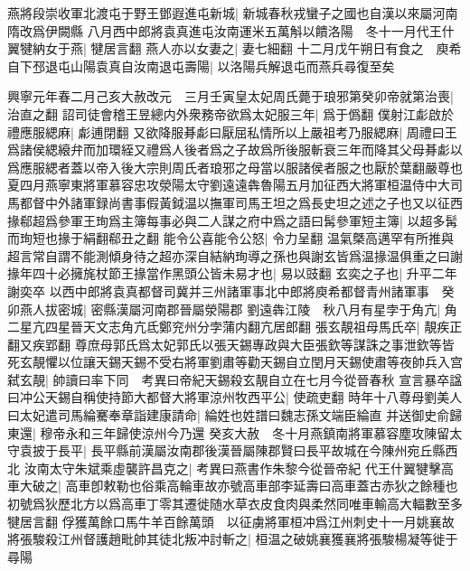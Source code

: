 燕將段崇收軍北渡屯于野王鄧遐進屯新城|{
	新城春秋戎蠻子之國也自漢以來屬河南隋改爲伊闕縣}
八月西中郎將袁真進屯汝南運米五萬斛以饋洛陽　冬十一月代王什翼犍納女于燕|{
	犍居言翻}
燕人亦以女妻之|{
	妻七細翻}
十二月戊午朔日有食之　庾希自下邳退屯山陽袁真自汝南退屯壽陽|{
	以洛陽兵解退屯而燕兵尋復至矣}


興寧元年春二月己亥大赦改元　三月壬寅皇太妃周氏薨于琅邪第癸卯帝就第治喪|{
	治直之翻}
詔司徒會稽王昱總内外衆務帝欲爲太妃服三年|{
	爲于僞翻}
僕射江虨啟於禮應服緦麻|{
	虨逋閉翻}
又欲降服朞虨曰厭屈私情所以上嚴祖考乃服緦麻|{
	周禮曰王爲諸侯緦縗弁而加環絰又禮爲人後者爲之子故爲所後服斬衰三年而降其父母朞虨以爲應服緦者蓋以帝入後大宗則周氏者琅邪之母當以服諸侯者服之也厭於葉翻嚴尊也}
夏四月燕寧東將軍慕容忠攻滎陽太守劉遠遠犇魯陽五月加征西大將軍桓温侍中大司馬都督中外諸軍録尚書事假黃鉞温以撫軍司馬王坦之爲長史坦之述之子也又以征西掾郗超爲參軍王珣爲主簿每事必與二人謀之府中爲之語曰髯參軍短主簿|{
	以超多髯而珣短也掾于絹翻郗丑之翻}
能令公喜能令公怒|{
	令力呈翻}
温氣槩高邁罕有所推與超言常自謂不能測傾身待之超亦深自結納珣導之孫也與謝玄皆爲温掾温俱重之曰謝掾年四十必擁旄杖節王掾當作黑頭公皆未易才也|{
	易以豉翻}
玄奕之子也|{
	升平二年謝奕卒}
以西中郎將袁真都督司冀并三州諸軍事北中郎將庾希都督青州諸軍事　癸卯燕人拔密城|{
	密縣漢屬河南郡晉屬滎陽郡}
劉遠犇江陵　秋八月有星孛于角亢|{
	角二星亢四星晉天文志角亢氐鄭兖州分孛蒲内翻亢居郎翻}
張玄靚祖母馬氏卒|{
	靚疾正翻又疾郢翻}
尊庶母郭氏爲太妃郭氏以張天錫專政與大臣張欽等謀誅之事泄欽等皆死玄靚懼以位讓天錫天錫不受右將軍劉肅等勸天錫自立閏月天錫使肅等夜帥兵入宫弑玄靚|{
	帥讀曰率下同　考異曰帝紀天錫殺玄靚自立在七月今從晉春秋}
宣言暴卒諡曰冲公天錫自稱使持節大都督大將軍涼州牧西平公|{
	使疏吏翻}
時年十八尊母劉美人曰太妃遣司馬綸騫奉章詣建康請命|{
	綸姓也姓譜曰魏志孫文端臣綸直}
并送御史俞歸東還|{
	穆帝永和三年歸使涼州今乃還}
癸亥大赦　冬十月燕鎮南將軍慕容塵攻陳留太守袁披于長平|{
	長平縣前漢屬汝南郡後漢晉屬陳郡賢曰長平故城在今陳州宛丘縣西北}
汝南太守朱斌乘虛襲許昌克之|{
	考異曰燕書作朱黎今從晉帝紀}
代王什翼犍擊高車大破之|{
	高車卽敕勒也俗乘高輪車故亦號高車部李延壽曰高車蓋古赤狄之餘種也初號爲狄歷北方以爲高車丁零其遷徙随水草衣皮食肉與柔然同唯車輸高大輻數至多犍居言翻}
俘獲萬餘口馬牛羊百餘萬頭　以征虜將軍桓冲爲江州刺史十一月姚襄故將張駿殺江州督護趙毗帥其徒北叛冲討斬之|{
	桓温之破姚襄獲襄將張駿楊凝等徙于尋陽}


